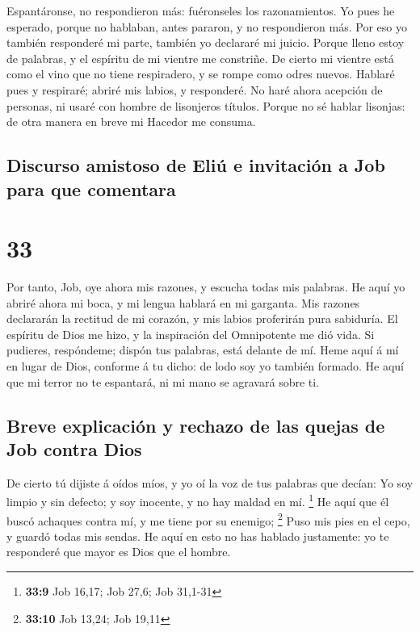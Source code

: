 Espantáronse, no respondieron más: fuéronseles los
razonamientos.  Yo pues he esperado, porque no hablaban,
antes pararon, y no respondieron más.  Por eso yo también
responderé mi parte, también yo declararé mi juicio. 
Porque lleno estoy de palabras, y el espíritu de mi vientre me
constriñe.  De cierto mi vientre está como el vino que no
tiene respiradero, y se rompe como odres nuevos.  Hablaré
pues y respiraré; abriré mis labios, y responderé.  No haré
ahora acepción de personas, ni usaré con hombre de lisonjeros títulos.
 Porque no sé hablar lisonjas: de otra manera en breve mi
Hacedor me consuma.

\hypertarget{discurso-amistoso-de-eliuxfa-e-invitaciuxf3n-a-job-para-que-comentara}{%
\subsection{Discurso amistoso de Eliú e invitación a Job para que
comentara}\label{discurso-amistoso-de-eliuxfa-e-invitaciuxf3n-a-job-para-que-comentara}}

\hypertarget{section-32}{%
\section{33}\label{section-32}}

 Por tanto, Job, oye ahora mis razones, y escucha todas mis
palabras.  He aquí yo abriré ahora mi boca, y mi lengua
hablará en mi garganta.  Mis razones declararán la rectitud
de mi corazón, y mis labios proferirán pura sabiduría.  El
espíritu de Dios me hizo, y la inspiración del Omnipotente me dió vida.
 Si pudieres, respóndeme; dispón tus palabras, está delante
de mí.  Heme aquí á mí en lugar de Dios, conforme á tu
dicho: de lodo soy yo también formado.  He aquí que mi
terror no te espantará, ni mi mano se agravará sobre ti.

\hypertarget{breve-explicaciuxf3n-y-rechazo-de-las-quejas-de-job-contra-dios}{%
\subsection{Breve explicación y rechazo de las quejas de Job contra
Dios}\label{breve-explicaciuxf3n-y-rechazo-de-las-quejas-de-job-contra-dios}}

 De cierto tú dijiste á oídos míos, y yo oí la voz de tus
palabras que decían:  Yo soy limpio y sin defecto; y soy
inocente, y no hay maldad en mí. \footnote{\textbf{33:9} Job 16,17; Job
  27,6; Job 31,1-31}  He aquí que él buscó achaques contra
mí, y me tiene por su enemigo; \footnote{\textbf{33:10} Job 13,24; Job
  19,11}  Puso mis pies en el cepo, y guardó todas mis
sendas.  He aquí en esto no has hablado justamente: yo te
responderé que mayor es Dios que el hombre.

